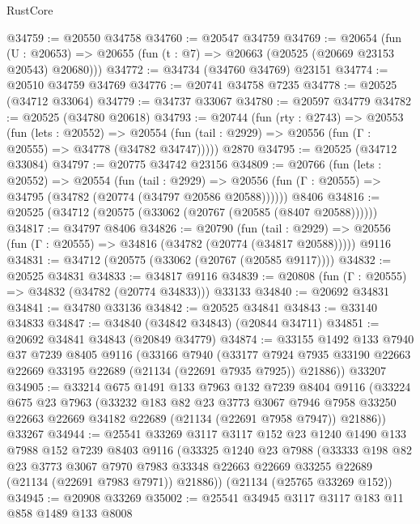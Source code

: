 \begin{lexlean}{RustCore}
\begin{coremodule}
@34759 := @20550 @34758
@34760 := @20547 @34759
@34769 := @20654
    (fun (U : @20653) => @20655 (fun (t : @7) => @20663 (@20525 (@20669 @23153 @20543) @20680)))
@34772 := @34734 (@34760 @34769) @23151
@34774 := @20510 @34759 @34769
@34776 := @20741 @34758 @7235
@34778 := @20525 (@34712 @33064)
@34779 := @34737 @33067
@34780 := @20597 @34779
@34782 := @20525 (@34780 @20618)
@34793 := @20744
    (fun (rty : @2743) =>
    @20553
      (fun (lets : @20552) =>
      @20554 (fun (tail : @2929) => @20556 (fun (Γ : @20555) => @34778 (@34782 @34747)))))
    @2870
@34795 := @20525 (@34712 @33084)
@34797 := @20775 @34742 @23156
@34809 := @20766
    (fun (lets : @20552) =>
    @20554
      (fun (tail : @2929) =>
      @20556 (fun (Γ : @20555) => @34795 (@34782 (@20774 (@34797 @20586 @20588))))))
    @8406
@34816 := @20525 (@34712 (@20575 (@33062 (@20767 (@20585 (@8407 @20588))))))
@34817 := @34797 @8406
@34826 := @20790
    (fun (tail : @2929) => @20556 (fun (Γ : @20555) => @34816 (@34782 (@20774 (@34817 @20588)))))
    @9116
@34831 := @34712 (@20575 (@33062 (@20767 (@20585 @9117))))
@34832 := @20525 @34831
@34833 := @34817 @9116
@34839 := @20808 (fun (Γ : @20555) => @34832 (@34782 (@20774 @34833))) @33133
@34840 := @20692 @34831
@34841 := @34780 @33136
@34842 := @20525 @34841
@34843 := @33140 @34833
@34847 := @34840 (@34842 @34843) (@20844 @34711)
@34851 := @20692 @34841 @34843 (@20849 @34779)
@34874 := @33155
    @1492
    @133
    @7940
    @37
    @7239
    @8405
    @9116
    (@33166
      @7940
      (@33177 @7924 @7935 @33190 @22663 @22669 @33195 @22689 (@21134 (@22691 @7935 @7925)) @21886))
    @33207
@34905 := @33214
    @675
    @1491
    @133
    @7963
    @132
    @7239
    @8404
    @9116
    (@33224
      @675
      @23
      @7963
      (@33232
        @183
        @82
        @23
        @3773
        @3067
        @7946
        @7958
        @33250
        @22663
        @22669
        @34182
        @22689
        (@21134 (@22691 @7958 @7947))
        @21886))
    @33267
@34944 := @25541
    @33269
    @3117
    @3117
    @152
    @23
    @1240
    @1490
    @133
    @7988
    @152
    @7239
    @8403
    @9116
    (@33325
      @1240
      @23
      @7988
      (@33333
        @198
        @82
        @23
        @3773
        @3067
        @7970
        @7983
        @33348
        @22663
        @22669
        @33255
        @22689
        (@21134 (@22691 @7983 @7971))
        @21886))
    (@21134 (@25765 @33269 @152))
@34945 := @20908 @33269
@35002 := @25541
    @34945
    @3117
    @3117
    @183
    @11
    @858
    @1489
    @133
    @8008

\end{coremodule}
\end{lexlean}
